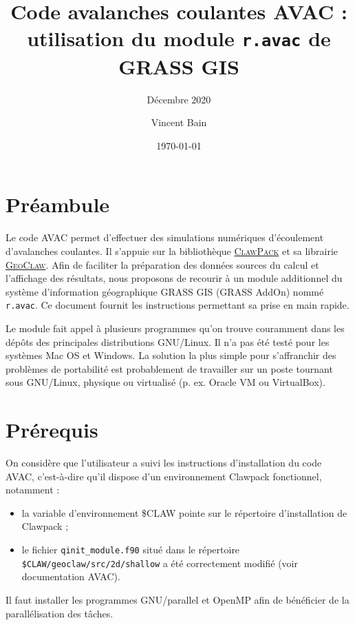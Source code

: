 \documentclass[12pt,oneside]{paper}
\newcommand{\bei}{\begin{itemize}}
\newcommand{\eit}{\end{itemize}}
\begin{document}
\pagestyle{fancy}
\title{Code avalanches coulantes AVAC : utilisation du module \texttt{r.avac} de GRASS GIS}
\subtitle{Décembre 2020}
\date{\today}
\author[1]{Vincent Bain}

\maketitle
\section{Préambule}

Le code AVAC permet d'effectuer des simulations numériques d'écoulement d'avalanches coulantes. Il s'appuie sur la bibliothèque \href{https://www.clawpack.org/}{\textsc{ClawPack}} et sa librairie \href{https://www.clawpack.org/geoclaw.html}{\textsc{GeoClaw}}. Afin de faciliter la préparation des données sources du calcul et l'affichage des résultats, nous proposons de recourir à un module additionnel du système d'information géographique GRASS GIS (GRASS AddOn) nommé \verb+r.avac+. Ce document fournit les instructions permettant sa prise en main rapide.

Le module fait appel à plusieurs programmes qu'on trouve couramment dans les dépôts des principales distributions GNU/Linux. Il n'a pas été testé pour les systèmes Mac OS et Windows. La solution la plus simple pour s'affranchir des problèmes de portabilité est probablement de travailler sur un poste tournant sous GNU/Linux, physique ou virtualisé (p. ex. Oracle VM ou  VirtualBox).

\section{Prérequis}

On considère que l'utilisateur a suivi les instructions d'installation du code AVAC, c'est-à-dire qu'il dispose d'un environnement Clawpack fonctionnel, notamment :
\bei
\item la variable d'environnement \$CLAW pointe sur le répertoire d'installation de Clawpack ;
\item le fichier \texttt{qinit\_module.f90} situé dans le répertoire \texttt{\$CLAW/geoclaw/src/2d/shallow} a été correctement modifié (voir documentation AVAC).
\eit

Il faut installer les programmes GNU/parallel et OpenMP afin de bénéficier de la parallélisation des tâches.
\end{document}
